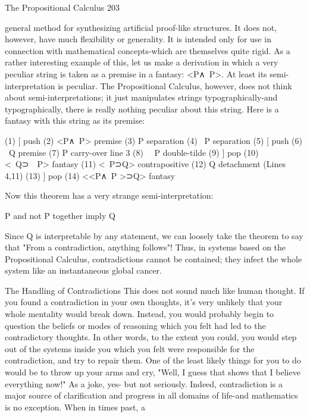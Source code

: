 The Propositional Calculus                                                                203

general method for synthesizing artificial proof-like structures. It does not, however, have
much flexibility or generality. It is intended only for use in connection with mathematical
concepts-which are themselves quite rigid. As a rather interesting example of this, let us
make a derivation in which a very peculiar string is taken as a premise in a fantasy:
<P∧~P>. At least its semi-interpretation is peculiar. The Propositional Calculus,
however, does not think about semi-interpretations; it just manipulates strings
typographically-and typographically, there is really nothing peculiar about this string.
Here is a fantasy with this string as its premise:

       (1)     [                      push
       (2)         <P∧~P>             premise
        (3)        P                  separation
       (4)         ~P                 separation
       (5)         [                  push
       (6)            ~Q              premise
       (7)           P                carry-over line 3
       (8)           ~~P              double-tilde
       (9)          ]                 pop
       (10)         <~Q⊃~~P>          fantasy
       (11)         <~P⊃Q>            contrapositive
       (12)        Q                  detachment (Lines 4,11)
       (13)    ]                      pop
       (14)    <<P∧~P >⊃Q>            fantasy

Now this theorem has a very strange semi-interpretation:

       P and not P together imply Q

Since Q is interpretable by any statement, we can loosely take the theorem to say that
"From a contradiction, anything follows"! Thus, in systems based on the Propositional
Calculus, contradictions cannot be contained; they infect the whole system like an
instantaneous global cancer.

                         The Handling of Contradictions
This does not sound much like human thought. If you found a contradiction in your own
thoughts, it's very unlikely that your whole mentality would break down. Instead, you
would probably begin to question the beliefs or modes of reasoning which you felt had
led to the contradictory thoughts. In other words, to the extent you could, you would step
out of the systems inside you which you felt were responsible for the contradiction, and
try to repair them. One of the least likely things for you to do would be to throw up your
arms and cry, "Well, I guess that shows that I believe everything now!" As a joke, yes-
but not seriously.
         Indeed, contradiction is a major source of clarification and progress in all domains
of life-and mathematics is no exception. When in times past, a


